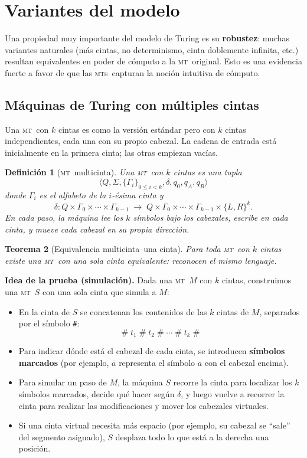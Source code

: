 \documentclass[11pt,a4paper]{article}
\theoremstyle{definicion}
\newtheorem{definicion}{Definición}[section]
\newtheorem{teorema}[definicion]{Teorema}
\newcommand{\MT}{\textsc{mt}}
\newcommand{\MTs}{\textsc{mt}s}
\begin{document}
\section{Variantes del modelo}

Una propiedad muy importante del modelo de Turing es su \textbf{robustez}: muchas variantes naturales (más cintas, no determinismo, cinta doblemente infinita, etc.) resultan equivalentes en poder de cómputo a la \MT\ original. Esto es una evidencia fuerte a favor de que las \MTs\ capturan la noción intuitiva de cómputo.

\subsection{Máquinas de Turing con múltiples cintas}

Una \MT\ con $k$ cintas es como la versión estándar pero con $k$ cintas independientes, cada una con su propio cabezal. La cadena de entrada está inicialmente en la primera cinta; las otras empiezan vacías.

\begin{definicion}[\MT\ multicinta]
Una \MT\ con $k$ cintas es una tupla
\[
\langle Q, \Sigma, \{\Gamma_i\}_{0 \leq i < k}, \delta, q_0, q_A, q_R \rangle
\]
donde $\Gamma_i$ es el alfabeto de la $i$-ésima cinta y
\[
\delta : Q \times \Gamma_0 \times \cdots \times \Gamma_{k-1} \;\longrightarrow\; Q \times \Gamma_0 \times \cdots \times \Gamma_{k-1} \times \{L, R\}^k.
\]
En cada paso, la máquina lee \emph{los $k$ símbolos} bajo los cabezales, escribe en cada cinta, y mueve cada cabezal en su propia dirección.
\end{definicion}

\begin{teorema}[Equivalencia multicinta--una cinta]
Para toda \MT\ con $k$ cintas existe una \MT\ con una sola cinta equivalente: reconocen el mismo lenguaje.
\end{teorema}

\textbf{Idea de la prueba (simulación).} Dada una \MT\ $M$ con $k$ cintas, construimos una \MT\ $S$ con una sola cinta que simula a $M$:

\begin{itemize}
    \item En la cinta de $S$ se concatenan los contenidos de las $k$ cintas de $M$, separados por el símbolo \texttt{\#}:
    \[
    \#\; t_1 \;\#\; t_2 \;\#\; \cdots \;\#\; t_k \;\#
    \]
    \item Para indicar dónde está el cabezal de cada cinta, se introducen \textbf{símbolos marcados} (por ejemplo, $\overline{a}$ representa el símbolo $a$ con el cabezal encima).
    \item Para simular un paso de $M$, la máquina $S$ recorre la cinta para localizar los $k$ símbolos marcados, decide qué hacer según $\delta$, y luego vuelve a recorrer la cinta para realizar las modificaciones y mover los cabezales virtuales.
    \item Si una cinta virtual necesita más espacio (por ejemplo, su cabezal se ``sale'' del segmento asignado), $S$ desplaza todo lo que está a la derecha una posición.
\end{itemize}
\end{document}
